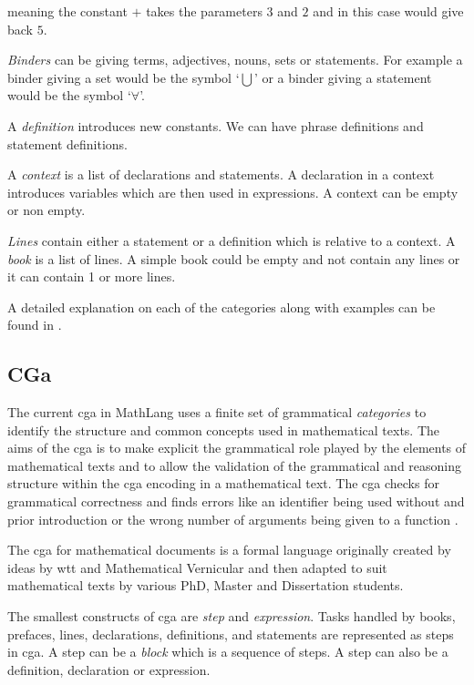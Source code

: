 meaning the constant $+$ takes the parameters $3$ and $2$ and in this case would
give back $5$.

\emph{Binders} can be giving terms, adjectives, nouns, sets or statements. For
example a binder giving a set would be the symbol `$\bigcup$' or a binder giving
a statement would be the symbol `$\forall$'.

 A \emph{definition} introduces new constants. We can have phrase definitions
 and statement definitions.
 
 A \emph{context} is a list of declarations and statements. A declaration in a
 context introduces variables which are then used in expressions. A context can
 be empty or non empty.

 \emph{Lines} contain either a statement or a definition which is relative to a
 context. A \emph{book} is a list of lines. A simple book could be empty and not
 contain any lines or it can contain 1 or more lines.
 
A detailed explanation on each of the categories along with examples can be
found in \cite{wtt}.

\subsection{CGa}
\label{subsec:cga}
The current \gls{cga} in MathLang uses a finite set of grammatical
\textit{categories} to identify the structure and common concepts used in
mathematical texts. The aims of the \gls{cga} is to make explicit the
grammatical role played by the elements of mathematical texts and to allow the
validation of the grammatical and reasoning structure within the \gls{cga}
encoding in a mathematical text. The \gls{cga} checks for grammatical
correctness and finds errors like an identifier being used without and prior
introduction or the wrong number of arguments being given to a function
\cite{krzysztofphd}.

The \gls{cga} for mathematical documents is a formal language originally created
by ideas by \gls{wtt} and Mathematical Vernicular \cite{mv} and then adapted to
suit mathematical texts by various PhD, Master and Dissertation students.

The smallest constructs of \gls{cga} are \emph{step} and \emph{expression}.
Tasks handled by books, prefaces, lines, declarations, definitions, and
statements are represented as steps in \gls{cga}. A step can be a \emph{block}
which is a sequence of steps. A step can also be a definition, declaration or
expression.

